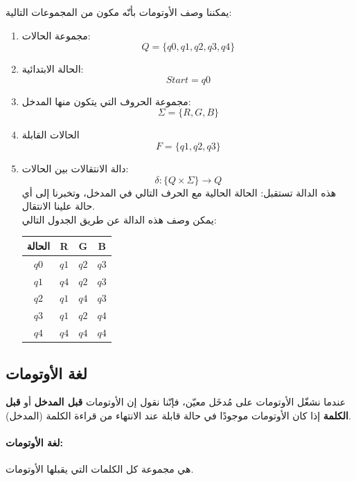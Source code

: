 \documentclass[12pt]{article}
\begin{document}
يمكننا وصف الأوتومات بأنّه مكون من المجموعات التالية:

\begin{enumerate}
    \item مجموعة الحالات:
    $$Q = \{q0, q1, q2, q3, q4\}$$

    \item الحالة الابتدائية:
    $$Start = q0$$

    \item مجموعة الحروف التي يتكون منها المدخل:
    $$ \Sigma = \{R,G,B\}$$

    \item الحالات القابلة
    $$ F = \{q1, q2, q3\}$$

    \item دالة الانتقالات بين الحالات:
    $$\delta: \{Q \times \Sigma \} \to Q$$
    هذه الدالة تستقبل: الحالة الحالية مع الحرف التالي في المدخل، وتخبرنا إلى أي حالة علينا الانتقال. \\
    يمكن وصف هذه الدالة عن طريق الجدول التالي:
    \begin{table}[h]
    \centering
    \begin{tabular}{|c|c|c|c|}
    \hline
    \textbf{الحالة} & \textbf{R} & \textbf{G} & \textbf{B} \\
    \hline
    $q0$ & $q1$ & $q2$ & $q3$ \\
    \hline
    $q1$ & $q4$ & $q2$ & $q3$ \\
    \hline
    $q2$ & $q1$ & $q4$ & $q3$ \\
    \hline
    $q3$ & $q1$ & $q2$ & $q4$ \\
    \hline
    $q4$ & $q4$ & $q4$ & $q4$ \\
    \hline
    \end{tabular}
    \end{table}
\end{enumerate}

\subsection{لغة الأوتومات}

عندما نشغّل الأوتومات على مُدخَل معيّن، فإنّنا نقول إن الأوتومات \textbf{قبل المدخل} أو \textbf{قبل الكلمة} إذا كان الأوتومات موجودًا في حالة قابلة عند الانتهاء من قراءة الكلمة (المدخل).

\paragraph{لغة الأوتومات: } هي مجموعة كل الكلمات التي يقبلها الأوتومات.
\end{document}
